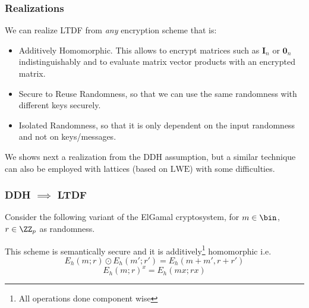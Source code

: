\documentclass{beamer}
\begin{document}
\begin{frame}
    \frametitle{Realizations}
    We can realize LTDF from \textit{any} encryption scheme that is:
    \begin{itemize}
        \item Additively Homomorphic. This allows to encrypt matrices such as $\mathbf{I}_n$ or $\mathbf{0}_n$ indistinguishably and to
              evaluate matrix vector products with an encrypted matrix.
        \item Secure to Reuse Randomness, so that we can use the same randomness with different keys securely.
        \item Isolated Randomness, so that it is only dependent on the input randomness and not on keys/messages.
    \end{itemize}
    We shows next a realization from the DDH assumption, but a similar technique
    can also be employed with lattices (based on $\mathrm{LWE}$) with some difficulties.
\end{frame}
\begin{frame}
    \frametitle{DDH $\implies$ LTDF}
    Consider the following variant of the ElGamal cryptosystem, for $m \in \bin$, $r \in \ZZ_p$ as randomness.
    
    \begin{pchstack}[center]
        \begin{pcvstack}
        \end{pcvstack}
    \end{pchstack}
    
    This scheme is semantically secure and it is additively\footnote{All operations done component wise} homomorphic i.e.
    \[ E_h(m; r) \odot E_h(m'; r') = E_h(m + m', r + r')\]
    \[ E_h(m; r)^x = E_h(mx; rx) \]
\end{frame}
\end{document}

